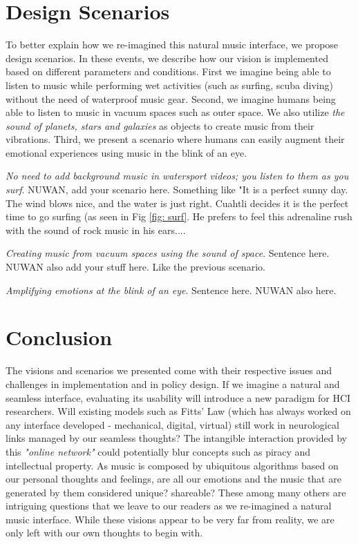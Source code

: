 \documentclass[acmtog]{acmart}
\begin{document}
\section{Design Scenarios}
To better explain how we re-imagined this natural music interface, we propose design scenarios. In these events, we describe how our vision is implemented based on different parameters and conditions. First we imagine being able to listen to music while performing wet activities (such as surfing, scuba diving) without the need of waterproof music gear. Second, we imagine humans being able to listen to music in vacuum spaces such as outer space. We also utilize \textit{the sound of planets, stars and galaxies} as objects to create music from their vibrations. Third, we present a scenario where humans can easily augment their emotional experiences using music in the blink of an eye. 

\textit{No need to add background music in watersport videos; you listen to them as you surf}. NUWAN, add your scenario here. Something like "It is a perfect sunny day. The wind blows nice, and the water is just right. Cuahtli decides it is the perfect time to go surfing (as seen in Fig \ref{fig: surf}. He prefers to feel this adrenaline rush with the sound of rock music in his ears.... 


\textit{Creating music from vacuum spaces using the sound of space}. Sentence here. 
NUWAN also add your stuff here. Like the previous scenario. 

\textit{Amplifying emotions at the blink of an eye}. Sentence here. 
NUWAN also here. 


\section{Conclusion}
The visions and scenarios we presented come with their respective issues and challenges in implementation and in policy design. If we imagine a natural and seamless interface, evaluating its usability will introduce a new paradigm for HCI researchers. Will existing models such as Fitts' Law (which has always worked on any interface developed - mechanical, digital, virtual) still work in neurological links managed by our seamless thoughts? The intangible interaction provided by this \textit{"online network"} could potentially blur concepts such as piracy and intellectual property. As music is composed by ubiquitous algorithms based on our personal thoughts and feelings, are all our emotions and the music that are generated by them considered unique? shareable? These among many others are intriguing questions that we leave to our readers as we re-imagined a natural music interface. While these visions appear to be very far from reality, we are only left with our own thoughts to begin with. 



\end{document}
